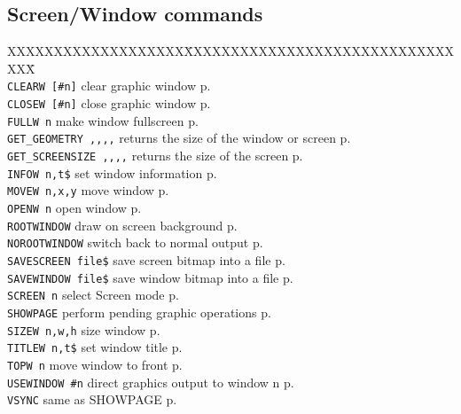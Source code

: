 \subsection{Screen/Window commands}
\begin{tabbing}
XXXXXXXXXXXXXXXXXXX\=XXXXXXXXXXXXXXXXXXXXXXXXXXXXXXXX\=\kill\\
\verb|CLEARW [#n]|  	\> clear graphic window\> p.\pageref{CLEARW}\\
\verb|CLOSEW [#n]|  	\> close graphic window\> p.\pageref{CLOSEW}\\
\verb|FULLW n| 		\>  make window fullscreen\> p.\pageref{FULLW}\\
\verb|GET_GEOMETRY ,,,,|  \> returns the size of the window or screen\> p.\pageref{GETiGEOMETRY}\\
\verb|GET_SCREENSIZE ,,,,|  \> returns the size of the screen\> p.\pageref{GETiSCREENSIZE}\\
\verb|INFOW n,t$|	\> set window information\> p.\pageref{INFOW}\\
\verb|MOVEW n,x,y|	\>  move window\> p.\pageref{MOVEW}\\
\verb|OPENW n| 		\>  open window\> p.\pageref{OPENW}\\
\verb|ROOTWINDOW|	\> draw on screen background\> p.\pageref{ROOTWINDOW}\\
\verb|NOROOTWINDOW|	\> switch back to normal output\> p.\pageref{NOROOTWINDOW}\\
\verb|SAVESCREEN file$|	\> save screen bitmap into a file\> p.\pageref{SAVESCREEN}\\
\verb|SAVEWINDOW file$|	\> save window bitmap into a file\> p.\pageref{SAVEWINDOW}\\
\verb|SCREEN n|		\> select Screen mode \> p.\pageref{SCREEN}\\
\verb|SHOWPAGE|		\> perform pending graphic operations\> p.\pageref{SHOWPAGE}\\
\verb|SIZEW n,w,h|	\> size window\> p.\pageref{SIZEW}\\
\verb|TITLEW n,t$|	\> set window title\> p.\pageref{TITLEW}\\
\verb|TOPW n| 		\>  move window to front\> p.\pageref{TOPW}\\
\verb|USEWINDOW #n|	\> direct graphics output to window n\> p.\pageref{USEWINDOW}\\
\verb|VSYNC|		\> same as SHOWPAGE\> p.\pageref{VSYNC}\\

 \end{tabbing}
 
